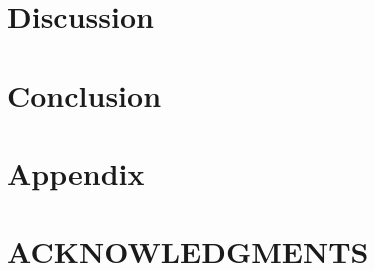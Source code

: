 \documentclass[reprint,english,notitlepage]{revtex4-2}
\begin{document}
\section{Discussion} \label{sec: discussion}

\section{Conclusion} \label{sec: conclusion}

\section{Appendix} \label{sec: appendix}

\section*{ACKNOWLEDGMENTS}

\newpage
\end{document}
